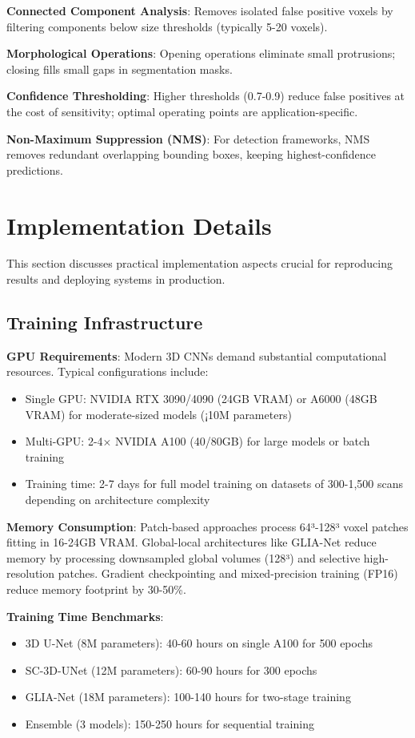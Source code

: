 \documentclass[conference]{IEEEtran}
\begin{document}
\textbf{Connected Component Analysis}: Removes isolated false positive voxels by filtering components below size thresholds (typically 5-20 voxels).

\textbf{Morphological Operations}: Opening operations eliminate small protrusions; closing fills small gaps in segmentation masks.

\textbf{Confidence Thresholding}: Higher thresholds (0.7-0.9) reduce false positives at the cost of sensitivity; optimal operating points are application-specific.

\textbf{Non-Maximum Suppression (NMS)}: For detection frameworks, NMS removes redundant overlapping bounding boxes, keeping highest-confidence predictions.

\section{Implementation Details}

This section discusses practical implementation aspects crucial for reproducing results and deploying systems in production.

\subsection{Training Infrastructure}

\textbf{GPU Requirements}: Modern 3D CNNs demand substantial computational resources. Typical configurations include:
\begin{itemize}
    \item Single GPU: NVIDIA RTX 3090/4090 (24GB VRAM) or A6000 (48GB VRAM) for moderate-sized models (¡10M parameters)
    \item Multi-GPU: 2-4× NVIDIA A100 (40/80GB) for large models or batch training
    \item Training time: 2-7 days for full model training on datasets of 300-1,500 scans depending on architecture complexity
\end{itemize}

\textbf{Memory Consumption}: Patch-based approaches process 64³-128³ voxel patches fitting in 16-24GB VRAM. Global-local architectures like GLIA-Net reduce memory by processing downsampled global volumes (128³) and selective high-resolution patches. Gradient checkpointing and mixed-precision training (FP16) reduce memory footprint by 30-50\%.

\textbf{Training Time Benchmarks}:
\begin{itemize}
    \item 3D U-Net (8M parameters): 40-60 hours on single A100 for 500 epochs
    \item SC-3D-UNet (12M parameters): 60-90 hours for 300 epochs
    \item GLIA-Net (18M parameters): 100-140 hours for two-stage training
    \item Ensemble (3 models): 150-250 hours for sequential training
\end{itemize}
\end{document}
